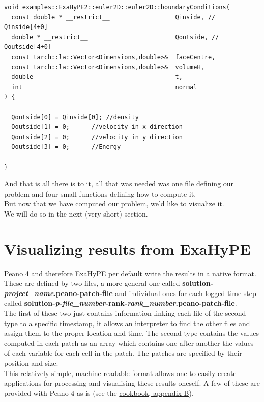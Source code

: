 \documentclass[12pt,letterpaper]{article}
\begin{document}
\begin{lstlisting}[style = C++]
void examples::ExaHyPE2::euler2D::euler2D::boundaryConditions(
  const double * __restrict__                  Qinside, // Qinside[4+0]
  double * __restrict__                        Qoutside, // Qoutside[4+0]
  const tarch::la::Vector<Dimensions,double>&  faceCentre,
  const tarch::la::Vector<Dimensions,double>&  volumeH,
  double                                       t,
  int                                          normal
) {
  
  Qoutside[0] = Qinside[0]; //density
  Qoutside[1] = 0;	    //velocity in x direction
  Qoutside[2] = 0;	    //velocity in y direction
  Qoutside[3] = 0;	    //Energy
  
}
\end{lstlisting}


And that is all there is to it, all that was needed was one file defining our problem and four small functions defining how to compute it. \\
But now that we have computed our problem, we'd like to visualize it.\\
We will do so in the next (very short) section.

\newpage

\section{Visualizing results from ExaHyPE}
\label{Visualize}

\vspace{0.3cm}

Peano 4 and therefore ExaHyPE per default write the results in a native format. These are defined by two files, a more general one called \textbf{solution-\textit{project\_name}.peano-patch-file} and individual ones for each logged time step called \textbf{solution-\textit{p}-\textit{file\_number}-rank-\textit{rank\_number}.peano-patch-file}.\\
The first of these two just contains information linking each file of the second type to a specific timestamp, it allows an interpreter to find the other files and assign them to the proper location and time. The second type contains the values computed in each patch as an array which contains one after another the values of each variable for each cell in the patch. The patches are specified by their position and size.\\
This relatively simple, machine readable format allows one to easily create applications for processing and visualising these results oneself. A few of these are provided with Peano 4 as is (see the \hyperlink{http://www.peano-framework.org/peano/p4/cookbook.pdf}{cookbook, appendix B}).
\end{document}
